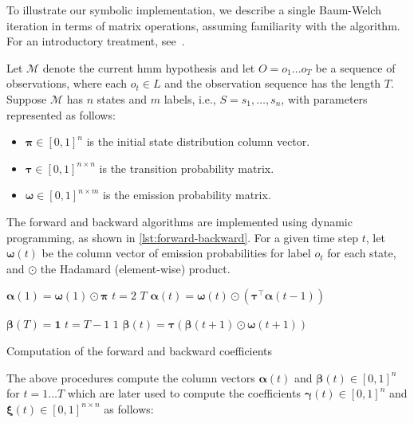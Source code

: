 To illustrate our symbolic implementation, we describe a single Baum-Welch iteration in terms of matrix operations, assuming familiarity with the algorithm. For an introductory treatment, see~\cite{Baum70,reynouard2024learning}.

Let $\mathcal{M}$ denote the current \gls{hmm} hypothesis and let $O = o_1 \dots o_T$ be a sequence of observations, where each $o_t \in L$ and the observation sequence has the length $T$. Suppose $\mathcal{M}$ has $n$ states and $m$ labels, i.e., $S = {s_1, \dots, s_n}$, with parameters represented as follows:


\begin{itemize}
    \item $\pmb{\pi} \in [0,1]^{n}$ is the initial state distribution column vector.
    \item $\pmb{\tau} \in [0,1]^{n \times n}$ is the transition probability matrix.
    \item $\pmb{\omega} \in [0,1]^{n \times m}$ is the emission probability matrix.
\end{itemize}


The forward and backward algorithms are implemented using dynamic programming, as shown in \autoref{lst:forward-backward}.
For a given time step $t$, let $\pmb{\omega}(t)$ be the column vector of emission probabilities for label $o_t$ for each state, and $\odot$ the Hadamard (element-wise) product.


\begin{listing}[htb!]
    \begin{codebox}
        \li $\pmb{\alpha}(1) = \pmb{\omega}(1) \odot \pmb{\pi}$
        \li \For $t = 2$ \To $T$ \Do
        \li $\pmb{\alpha}(t) = \pmb{\omega}(t) \odot \left( \pmb{\tau}^\top \pmb{\alpha}(t-1) \right)$
        \End
    \end{codebox}
    \begin{codebox}
        \li $\pmb{\beta}(T) = \mathbf{1}$
        \li \For $t = T-1$ \To $1$ \Do
        \li $\pmb{\beta}(t) = \pmb{\tau} \left( \pmb{\beta}(t+1) \odot \pmb{\omega}(t+1) \right)$
        \End
    \end{codebox}
    \caption{Computation of the forward and backward coefficients}
    \label{lst:forward-backward}
\end{listing}


The above procedures compute the column vectors $\pmb{\alpha}(t)$ and $\pmb{\beta}(t) \in [0,1]^{n}$ for $t = 1\dots T$ which are later used to compute the coefficients $\pmb{\gamma}(t) \in [0,1]^{n}$ and $\pmb{\xi}(t) \in [0,1]^{n \times n}$ as follows:

